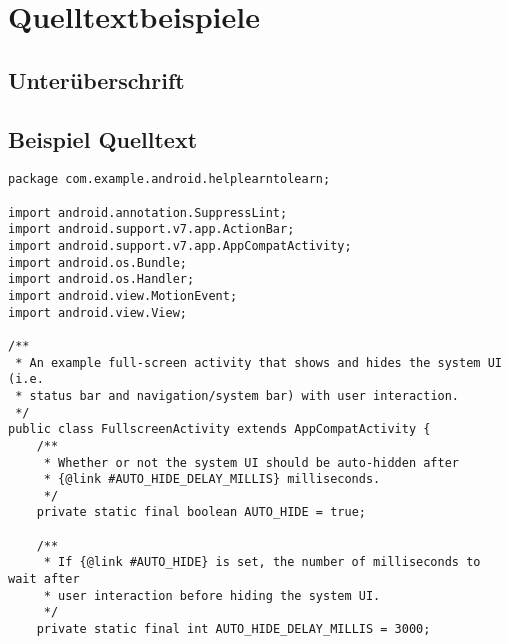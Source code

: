 \documentclass[a4paper, 10pt]{scrartcl}
\begin{document}
\section{Quelltextbeispiele}

\subsection{Unterüberschrift}

\subsection{Beispiel Quelltext}

\begin{lstlisting}
package com.example.android.helplearntolearn;

import android.annotation.SuppressLint;
import android.support.v7.app.ActionBar;
import android.support.v7.app.AppCompatActivity;
import android.os.Bundle;
import android.os.Handler;
import android.view.MotionEvent;
import android.view.View;

/**
 * An example full-screen activity that shows and hides the system UI (i.e.
 * status bar and navigation/system bar) with user interaction.
 */
public class FullscreenActivity extends AppCompatActivity {
    /**
     * Whether or not the system UI should be auto-hidden after
     * {@link #AUTO_HIDE_DELAY_MILLIS} milliseconds.
     */
    private static final boolean AUTO_HIDE = true;

    /**
     * If {@link #AUTO_HIDE} is set, the number of milliseconds to wait after
     * user interaction before hiding the system UI.
     */
    private static final int AUTO_HIDE_DELAY_MILLIS = 3000;
\end{lstlisting}
\end{document}
